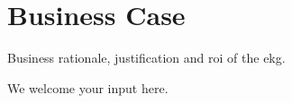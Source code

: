 \section{Business Case}\label{sec:ekgmm-b-1-2} %

Business rationale, justification and \gls{roi} of the \gls{ekg}.

We welcome your input here.


